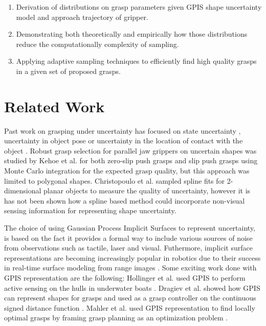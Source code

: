 \documentclass[letterpaper, 10 pt, conference]{ieeeconf}  %
\begin{document}
\begin{enumerate}
	\item Derivation of  distributions on grasp parameters given GPIS shape uncertainty model and approach trajectory of gripper.
	\item  Demonstrating both theoretically and empirically how those distributions reduce the computationally complexity of sampling.
	\item Applying adaptive sampling techniques to efficiently find high quality grasps in a given set of proposed grasps. 
\end{enumerate}
 
\section{Related Work}

 Past work on grasping under uncertainty has focused on state uncertainty \cite{goldberg1990bayesian}\cite{goldberg1990stochastic} \cite{stulp2011learning},  uncertainty in object pose \cite{christopoulos2007handling}  \cite{felip2009robust} \cite{kim2012physically} or uncertainty in the location of contact with the object \cite{zheng2005}. Robust grasp selection for parallel jaw grippers on uncertain shapes was studied by Kehoe et al. for both zero-slip push grasps \cite{kehoe2012toward} and slip push grasps \cite{kehoe2012estimating} using Monte Carlo integration for the expected grasp quality, but this approach was limited to polygonal shapes.  Christopoulo et al. sampled spline fits for 2-dimensional planar objects to measure the quality of uncertainty, however it is has not been shown how a spline based method could incorporate non-visual sensing information for representing shape uncertainty.
 
 The choice of using Gaussian Process Implicit Surfaces to represent uncertainty, is based on the fact it provides a formal way to include various sources of noise from observations such as tactile, laser and visual. Futhermore, implicit surface representations are becoming increasingly popular in robotics due to their success in real-time surface modeling from range images \cite{curless1996volumetric}\cite{newcombe2011kinectfusion}\cite{hornung2013octomap}. Some exciting work done with GPIS representation are the following: Hollinger et al. used GPIS to perform active sensing on the hulls in underwater boats \cite{hollinger2013}. Dragiev et al. showed how GPIS can represent shapes for grasps and used  as a grasp controller on the continuous signed distance function \cite{dragiev2011}. Mahler et al. used GPIS representation to find locally optimal grasps by framing grasp planning as an optimization problem \cite{jeff}. 
 
\end{document}
